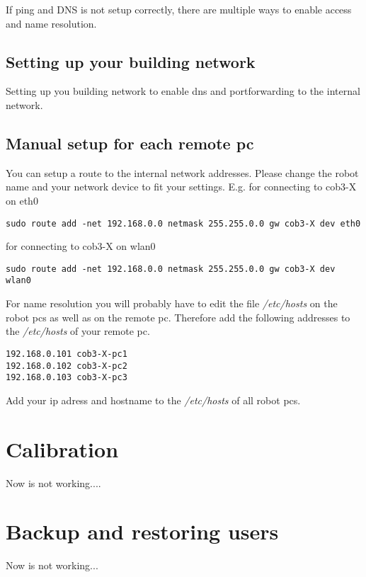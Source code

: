If ping and DNS is not setup correctly, there are multiple ways to enable access and name resolution.

\subsection{Setting up your building network}
Setting up you building network to enable dns and portforwarding to the internal network.

\subsection{Manual setup for each remote pc}
You can setup a route to the internal network addresses. Please change the robot name and your network device to fit your settings. E.g. for connecting to cob3-X on eth0
\begin{lstlisting}
sudo route add -net 192.168.0.0 netmask 255.255.0.0 gw cob3-X dev eth0
\end{lstlisting}

for connecting to cob3-X on wlan0
\begin{lstlisting}
sudo route add -net 192.168.0.0 netmask 255.255.0.0 gw cob3-X dev wlan0
\end{lstlisting}


For name resolution you will probably have to edit the file \textit{/etc/hosts} on the robot pcs as well as on the remote pc. Therefore add the following addresses to the \textit{/etc/hosts} of your remote pc.
\begin{lstlisting}
192.168.0.101 cob3-X-pc1
192.168.0.102 cob3-X-pc2
192.168.0.103 cob3-X-pc3
\end{lstlisting}

Add your ip adress and hostname to the \textit{/etc/hosts} of all robot pcs.

\section{Calibration}
Now is not working....
\section{Backup and restoring users}   
Now is not working...    


